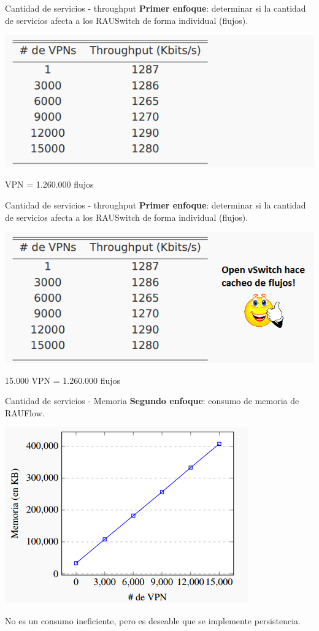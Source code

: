\documentclass[xcolor=svgnames]{beamer}
\begin{document}
\begin{frame}{Cantidad de servicios - throughput}
	\textbf{Primer enfoque}: determinar si la cantidad de servicios afecta a los RAUSwitch de forma individual (flujos).
	\pause
	\begin{center}
		\includegraphics[scale=0.6]{throughput1}
	\end{center}
	 VPN = 1.260.000 flujos
\end{frame}

\begin{frame}{Cantidad de servicios - throughput}
	\textbf{Primer enfoque}: determinar si la cantidad de servicios afecta a los RAUSwitch de forma individual (flujos).
	\begin{center}
		\includegraphics[scale=0.6]{throughput2}
	\end{center}
	15.000 VPN = 1.260.000 flujos
\end{frame}

\begin{frame}{Cantidad de servicios - Memoria}
	\textbf{Segundo enfoque}: consumo de memoria de RAUFlow.
	\pause
	\begin{center}
		\includegraphics[scale=0.8]{memoria_rauflow}
	\end{center}
	\pause
	No es un consumo ineficiente, pero es deseable que se implemente persistencia.
\end{frame}
\end{document}
